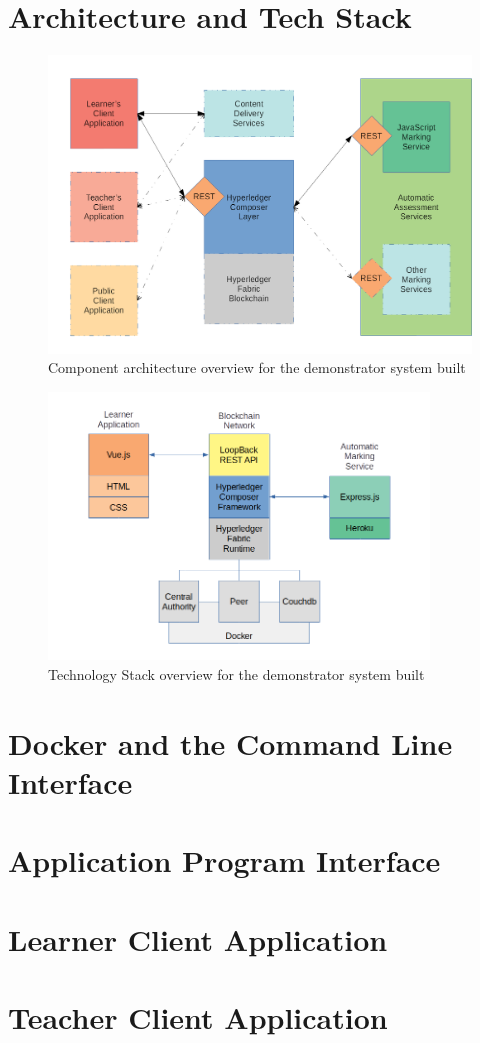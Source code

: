 \section{Architecture and Tech Stack}

\begin{figure}[!ht] 
    \centering    
    \includegraphics[width=1.0\textwidth]{architecture}
    \caption[Component architecture overview for the demonstrator system built]
        {Component architecture overview for the demonstrator system built}
    \label{fig:architecture}
\end{figure} 

\begin{figure}[!ht] 
    \centering    
    \includegraphics[width=0.9\textwidth]{techstack}
    \caption[Technology Stack overview for the demonstrator system built]
        {Technology Stack overview for the demonstrator system built}
    \label{fig:techstack}
\end{figure} 

\section{Docker and the Command Line Interface}

\section{Application Program Interface}

\section{Learner Client Application}

\section{Teacher Client Application}

